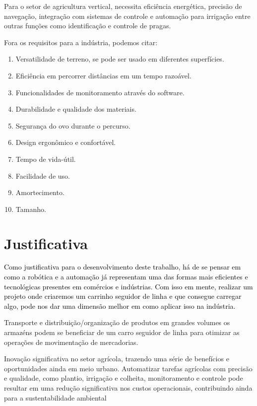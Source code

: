 Para o setor de agricultura vertical, necessita eficiência energética, precisão de navegação, integração com sistemas de controle e automação para irrigação entre outras funções como identificação e controle de pragas. 

Fora os requisitos para a indústria, podemos citar:
\begin{enumerate}
    \item Versatilidade de terreno, se pode ser usado em diferentes superfícies.
    \item Eficiência em percorrer distâncias em um tempo razoável.
    \item Funcionalidades de monitoramento através do software.
    \item Durabilidade e qualidade dos materiais.
    \item Segurança do ovo durante o percurso.
    \item Design ergonômico e confortável.
    \item Tempo de vida-útil.
    \item Facilidade de uso.
    \item Amortecimento.
    \item Tamanho.
\end{enumerate}

\section{Justificativa} 

\textcolor{black}{
Como justificativa para o desenvolvimento deste trabalho, há de se pensar em como a robótica e a automação já representam uma das formas mais eficientes e tecnológicas presentes em comércios e indústrias. Com isso em mente, realizar um projeto onde criaremos um carrinho seguidor de linha e que consegue carregar algo, pode nos dar uma dimensão melhor em como aplicar isso na indústria.}

{Transporte e distribuição/organização de produtos em grandes volumes os armazéns podem se beneficiar de um carro seguidor de linha para otimizar as operações de movimentação de mercadorias. 

Inovação significativa no setor agrícola, trazendo uma série de benefícios e oportunidades ainda em meio urbano. Automatizar tarefas agrícolas com precisão e qualidade, como plantio, irrigação e colheita, monitoramento e controle pode resultar em uma redução significativa nos custos operacionais, contribuindo ainda para a sustentabilidade ambiental }

